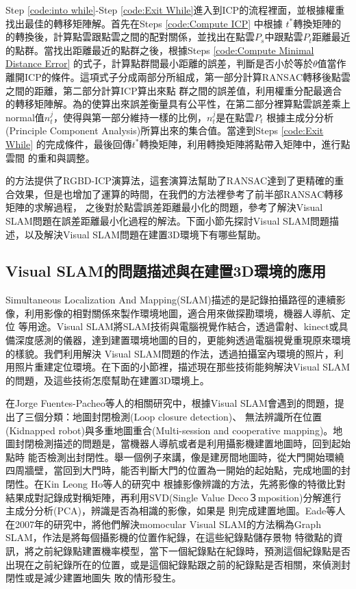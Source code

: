 	Step \ref{code:into while}-Step \ref{code:Exit While}進入到ICP的流程裡面，並根據權重找出最佳的轉移矩陣解。首先在Steps \ref{code:Compute ICP} 中根據
$t^*$轉換矩陣的的轉換後，計算點雲跟點雲之間的配對關係，並找出在點雲$P_s$中跟點雲$P_t$距離最近的點群。當找出距離最近的點群之後，根據Steps \ref{code:Compute Minimal Distance
Error} 的式子，計算點群間最小距離的誤差，判斷是否小於等於$\theta$值當作離開ICP的條件。這項式子分成兩部分所組成，第一部分計算RANSAC轉移後點雲之間的距離，第二部分計算ICP算出來點
群之間的誤差值，利用權重分配最適合的轉移矩陣解。為的使算出來誤差衡量具有公平性，在第二部分裡算點雲誤差乘上normal值${n_t^j}$，使得與第一部分維持一樣的比例，${n_t^j}$是在點雲$P_t$
根據主成分分析(Principle Component Analysis)所算出來的集合值。當達到Steps \ref{code:Exit While} 的完成條件，最後回傳$t^*$轉換矩陣，利用轉換矩陣將點帶入矩陣中，進行點雲間
的重和與調整。

	\cite{Henry2012}的方法提供了RGBD-ICP演算法，這套演算法幫助了RANSAC達到了更精確的重合效果，但是也增加了運算的時間，在我們的方法裡參考了前半部RANSAC轉移矩陣的求解過程，
之後對於點雲誤差距離最小化的問題，參考了解決Visual SLAM問題在誤差距離最小化過程的解法。下面小節先探討Visual SLAM問題描述，以及解決Visual SLAM問題在建置3D環境下有哪些幫助。
	
\subsection{Visual SLAM的問題描述與在建置3D環境的應用}

	Simultaneous Localization And Mapping(SLAM)描述的是記錄拍攝路徑的連續影像，利用影像的相對關係來製作環境地圖，適合用來做探勘環境，機器人導航、定位
等用途。Visual SLAM將SLAM技術與電腦視覺作結合，透過雷射、kinect或具備深度感測的儀器，達到建置環境地圖的目的，更能夠透過電腦視覺重現原來環境的樣貌。我們利用解決
Visual SLAM問題的作法，透過拍攝室內環境的照片，利用照片重建定位環境。在下面的小節裡，描述現在那些技術能夠解決Visual SLAM的問題，及這些技術怎麼幫助在建置3D環境上。

	在Jorge Fuentes-Pacheo等人的相關研究\cite{Fuentes-Pacheco2012}中，根據Visual SLAM會遇到的問題，提出了三個分類：地圖封閉檢測(Loop closure detection)、
無法辨識所在位置(Kidnapped robot)與多重地圖重合(Multi-session and cooperative mapping)。地圖封閉檢測描述的問題是，當機器人導航或者是利用攝影機建置地圖時，回到起始點時
能否檢測出封閉性。舉一個例子來講，像是建房間地圖時，從大門開始環繞四周牆壁，當回到大門時，能否判斷大門的位置為一開始的起始點，完成地圖的封閉性。在Kin Leong Ho等人的研究中
\cite{Ho2007}根據影像辨識的方法，先將影像的特徵比對結果成對記錄成對稱矩陣，再利用SVD(Single Value Deco３mposition)分解進行主成分分析(PCA)，辨識是否為相識的影像，如果是
則完成建置地圖。Eade等人在2007年的研究中\cite{Eade2007}，將他們解決momocular Visual SLAM的方法稱為Graph SLAM，作法是將每個攝影機的位置作紀錄，在這些紀錄點儲存景物
特徵點的資訊，將之前紀錄點建置機率模型，當下一個紀錄點在紀錄時，預測這個紀錄點是否出現在之前紀錄所在的位置，或是這個紀錄點跟之前的紀錄點是否相關，來偵測封閉性或是減少建置地圖失
敗的情形發生。

